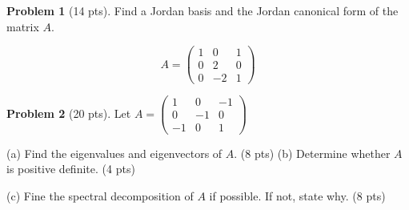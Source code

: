 \documentclass[12pt]{amsart}
\theoremstyle{definition}
\newtheorem{prob}{Problem}
\begin{document}
\newpage

\begin{prob}[14 pts]
Find a Jordan basis and the Jordan canonical form of the matrix $A$.

\[A=\begin{pmatrix}
	1&0&1\\0&2&0\\0&-2&1
\end{pmatrix}\]
	
\end{prob}
\newpage

\begin{prob}[20 pts]
	Let $A=\begin{pmatrix}
		1&0&-1\\0&-1&0\\-1&0&1
	\end{pmatrix}$
	
	(a) Find the eigenvalues and eigenvectors of $A$. (8 pts)
	\vspace{10cm}
	\newpage
	(b) Determine whether $A$ is positive definite. (4 pts) \vspace{6cm}
	
	(c) Fine the spectral decomposition of $A$ if possible. If not, state why. (8 pts)
\end{prob}
\end{document}
